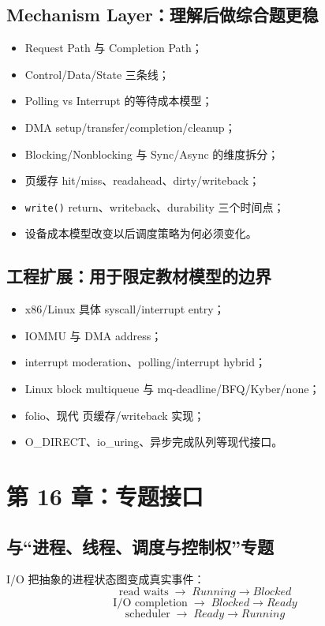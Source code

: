 \documentclass[11pt,a4paper]{ctexart}
\newcommand{\code}[1]{\texttt{#1}}
\newcommand{\arr}{\;\longrightarrow\;}
\begin{document}
\subsection{Mechanism Layer：理解后做综合题更稳}
\begin{itemize}
  \item Request Path 与 Completion Path；
  \item Control/Data/State 三条线；
  \item Polling vs Interrupt 的等待成本模型；
  \item DMA setup/transfer/completion/cleanup；
  \item Blocking/Nonblocking 与 Sync/Async 的维度拆分；
  \item 页缓存 hit/miss、readahead、dirty/writeback；
  \item \code{write()} return、writeback、durability 三个时间点；
  \item 设备成本模型改变以后调度策略为何必须变化。
\end{itemize}

\subsection{工程扩展：用于限定教材模型的边界}
\begin{itemize}
  \item x86/Linux 具体 syscall/interrupt entry；
  \item IOMMU 与 DMA address；
  \item interrupt moderation、polling/interrupt hybrid；
  \item Linux block multiqueue 与 mq-deadline/BFQ/Kyber/none；
  \item folio、现代 页缓存/writeback 实现；
  \item O\_DIRECT、io\_uring、异步完成队列等现代接口。
\end{itemize}

\section{第 16 章：专题接口}

\subsection{与“进程、线程、调度与控制权”专题}
I/O 把抽象的进程状态图变成真实事件：
\[
\boxed{\text{read waits}\arr Running\to Blocked}
\]
\[
\boxed{\text{I/O completion}\arr Blocked\to Ready}
\]
\[
\boxed{\text{scheduler}\arr Ready\to Running}
\]
\end{document}
